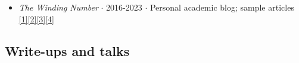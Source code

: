 \documentclass{article}
\begin{document}
\begin{itemize}

    \item \emph{The Winding Number} $\cdot$ 2016-2023 $\cdot$ Personal academic blog; sample articles \href{https://thewindingnumber.blogspot.com/2019/10/sigma-fields-are-venn-diagrams.html}{[1]}\href{https://thewindingnumber.blogspot.com/2022/10/a-crash-course-on-mathematical-logic.html}{[2]}\href{https://thewindingnumber.blogspot.com/2020/08/hacking-evidential-decision-theory.html}{[3]}\href{https://thewindingnumber.blogspot.com/2019/05/whats-with-e-1x-on-smooth-non-analytic.html}{[4]}

\end{itemize}

\subsection*{Write-ups and talks}
\end{document}
